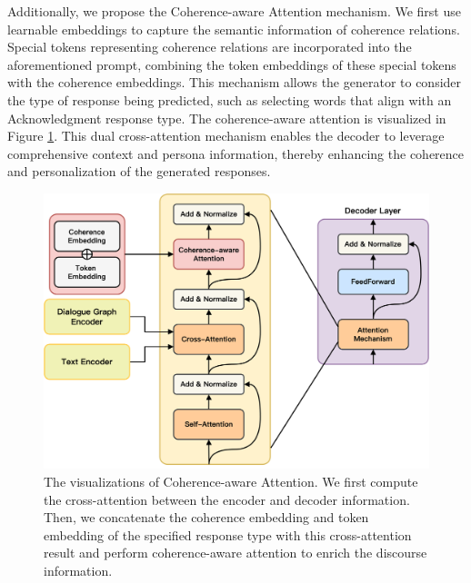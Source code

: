 Additionally, we propose the Coherence-aware Attention mechanism. We first use learnable embeddings to capture the semantic information of coherence relations. Special tokens representing coherence relations are incorporated into the aforementioned prompt, combining the token embeddings of these special tokens with the coherence embeddings. This mechanism allows the generator to consider the type of response being predicted, such as selecting words that align with an Acknowledgment response type. The coherence-aware attention is visualized in Figure \ref{fig:coherence-aware_attention}. This dual cross-attention mechanism enables the decoder to leverage comprehensive context and persona information, thereby enhancing the coherence and personalization of the generated responses.

\begin{figure}[ht]
    \centering
    \includegraphics[width=1.00\textwidth]{./context/methodology/images/coherence-aware_attention.png}
    \caption{The visualizations of Coherence-aware Attention. We first compute the cross-attention between the encoder and decoder information. Then, we concatenate the coherence embedding and token embedding of the specified response type with this cross-attention result and perform coherence-aware attention to enrich the discourse information.}
    \label{fig:coherence-aware_attention}
\end{figure}

